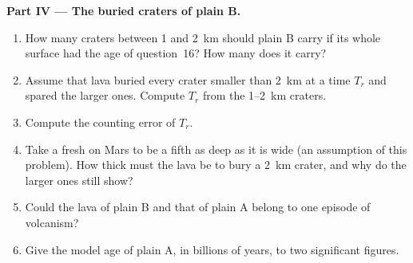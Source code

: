 \begin{problem}
\medskip\noindent\textbf{Part IV --- The buried craters of plain B.}
\begin{enumerate}[resume]
\item How many craters between 1 and \qty{2}{km} should plain B carry if
  its whole surface had the age of question~16? How many does it carry?
\item Assume that lava buried every crater smaller than \qty{2}{km} at a
  time $T_r$ and spared the larger ones. Compute $T_r$ from the
  \num{1}--\qty{2}{km} craters.
\item Compute the counting error of $T_r$.
\item Take a fresh  on Mars to be a fifth as deep as it is
  wide (an assumption of this problem). How thick must the lava be to bury
  a \qty{2}{km} crater, and why do the larger ones still show?
\item Could the lava of plain B and that of plain A belong to one episode
  of volcanism?
\item Give the model age of plain A, in billions of years, to two
  significant figures.
\end{enumerate}
\end{problem}

